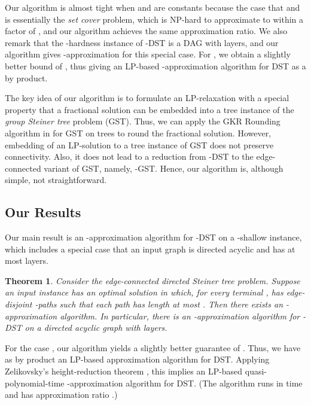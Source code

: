 \documentclass[11pt]{article}
\newtheorem{theorem}{Theorem}
\theoremstyle{definition}
\theoremstyle{remark}
\begin{document}
Our algorithm is almost tight when  and  are constants
because the case that  and  is essentially 
the {\em set cover} problem, which is NP-hard to approximate to within
a factor of  \cite{LundY94,Feige98},
and our algorithm achieves the same approximation ratio.
We also remark that the -hardness instance of
-DST is a DAG with  layers, and our algorithm gives 
-approximation for this special case.
For , we obtain a slightly better bound of ,
thus giving an LP-based -approximation algorithm for DST
as a by product. 

The key idea of our algorithm is to formulate an LP-relaxation
with a special property that a fractional solution
can be embedded into a tree instance of 
the {\em group Steiner tree} problem (GST).
Thus, we can apply the GKR Rounding algorithm in \cite{GargKR00}
for GST on trees to round the fractional solution.
However, embedding of an LP-solution to a tree instance of GST does
not preserve connectivity.
Also, it does not lead to a reduction from -DST to 
the  edge-connected variant of GST, namely, -GST. 
Hence, our algorithm is, although simple, not straightforward. 


\subsection{Our Results}

Our main result is an -approximation
algorithm for -DST on a -shallow instance,
which includes a special case that an input graph 
is directed acyclic and has at most  layers. 

\begin{theorem}
\label{thm:approx-k-dst}
Consider the  edge-connected directed Steiner tree problem.
Suppose an input instance has an optimal solution  in which,
for every terminal , 
 has  edge-disjoint -paths 
such that each path has length at most . 
Then there exists an -approximation
algorithm.
In particular, there is an 
-approximation
algorithm for -DST on a directed acyclic graph with  layers.
\end{theorem}

For the case , our algorithm yields a slightly better guarantee
of . 
Thus, we have as by product an LP-based approximation algorithm 
for DST.
Applying Zelikovsky's height-reduction theorem
\cite{Zelikovsky97,HelvigRZ01},
this implies an LP-based quasi-polynomial-time
-approximation algorithm for DST.
(The algorithm runs in time  and has approximation ratio
.)
\end{document}
